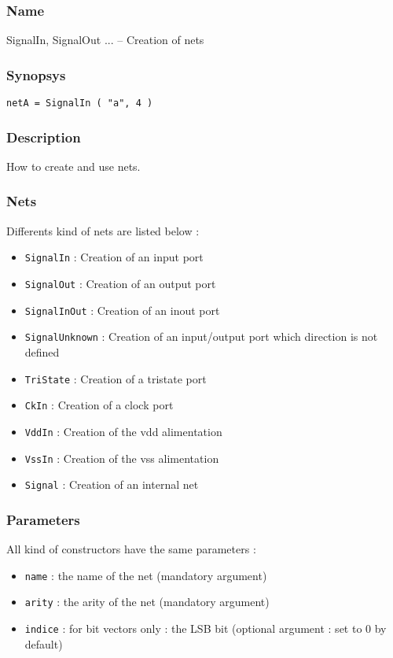 \subsubsection{Name}

SignalIn, SignalOut ... -- Creation of nets

\subsubsection{Synopsys}

\begin{verbatim}
netA = SignalIn ( "a", 4 )
\end{verbatim}

\subsubsection{Description}

How to create and use nets.

\subsubsection{Nets}

Differents kind of nets are listed below :
\begin{itemize}
    \item \verb-SignalIn- : Creation of an input port
    \item \verb-SignalOut- : Creation of an output port
    \item \verb-SignalInOut- : Creation of an inout port
    \item \verb-SignalUnknown- : Creation of an input/output port which direction is not defined
    \item \verb-TriState- : Creation of a tristate port
    \item \verb-CkIn- : Creation of a clock port
    \item \verb-VddIn- : Creation of the vdd alimentation
    \item \verb-VssIn- : Creation of the vss alimentation
    \item \verb-Signal- : Creation of an internal net
\end{itemize}
        
\subsubsection{Parameters}

All kind of constructors have the same parameters :
\begin{itemize}
    \item \verb-name- : the name of the net (mandatory argument)
    \item \verb-arity- : the arity of the net (mandatory argument)
    \item \verb-indice- : for bit vectors only : the LSB bit (optional argument : set to 0 by default)
\end{itemize}

